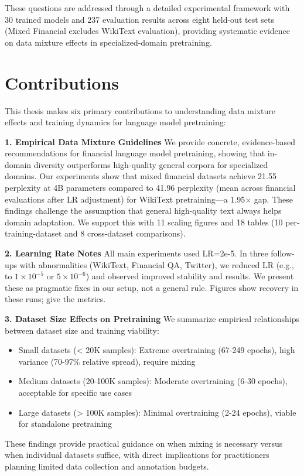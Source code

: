 These questions are addressed through a detailed experimental framework with 30 trained models and 237 evaluation results across eight held-out test sets (Mixed Financial excludes WikiText evaluation), providing systematic evidence on data mixture effects in specialized-domain pretraining.

\section{Contributions}

This thesis makes six primary contributions to understanding data mixture effects and training dynamics for language model pretraining:

\textbf{1. Empirical Data Mixture Guidelines}
We provide concrete, evidence-based recommendations for financial language model pretraining, showing that in-domain diversity outperforms high-quality general corpora for specialized domains. Our experiments show that mixed financial datasets achieve 21.55 perplexity at 4B parameters compared to 41.96 perplexity (mean across financial evaluations after LR adjustment) for WikiText pretraining—a 1.95$\times$ gap. These findings challenge the assumption that general high-quality text always helps domain adaptation. We support this with 11 scaling figures and 18 tables (10 per-training-dataset and 8 cross-dataset comparisons).

\textbf{2. Learning Rate Notes}
All main experiments used LR=2e-5. In three follow-ups with abnormalities (WikiText, Financial QA, Twitter), we reduced LR (e.g., to $1\times10^{-5}$ or $5\times10^{-6}$) and observed improved stability and results. We present these as pragmatic fixes in our setup, not a general rule. Figures  show recovery in these runs;  give the metrics.

\textbf{3. Dataset Size Effects on Pretraining}
We summarize empirical relationships between dataset size and training viability:
\begin{itemize}
    \item Small datasets (< 20K samples): Extreme overtraining (67-249 epochs), high variance (70-97\% relative spread), require mixing
    \item Medium datasets (20-100K samples): Moderate overtraining (6-30 epochs), acceptable for specific use cases
    \item Large datasets (> 100K samples): Minimal overtraining (2-24 epochs), viable for standalone pretraining
\end{itemize}
These findings provide practical guidance on when mixing is necessary versus when individual datasets suffice, with direct implications for practitioners planning limited data collection and annotation budgets.

